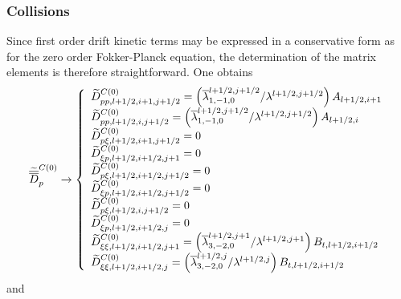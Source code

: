 

\subsubsection{Collisions}

Since first order drift kinetic terms may be expressed in a conservative
form as for the zero order Fokker-Planck equation, the determination of the
matrix elements is therefore straightforward. One obtains
\begin{equation}
\widetilde{\overline{\overline{D}}}_{p}^{C\left( 0\right) }\rightarrow
\left\{
\begin{array}{l}
\widetilde{D}_{pp,l+1/2,i+1,j+1/2}^{C\left( 0\right) }=\left( \overline{%
\lambda }_{1,-1,0}^{l+1/2,j+1/2}/\lambda ^{l+1/2,j+1/2}\right) A_{l+1/2,i+1}
\\
\widetilde{D}_{pp,l+1/2,i,j+1/2}^{C\left( 0\right) }=\left( \overline{%
\lambda }_{1,-1,0}^{l+1/2,j+1/2}/\lambda ^{l+1/2,j+1/2}\right) A_{l+1/2,i}
\\
\widetilde{D}_{p\xi ,l+1/2,i+1,j+1/2}^{C\left( 0\right) }=0 \\
\widetilde{D}_{\xi p,l+1/2,i+1/2,j+1}^{C\left( 0\right) }=0 \\
\widetilde{D}_{p\xi ,l+1/2,i+1/2,j+1/2}^{C\left( 0\right) }=0 \\
\widetilde{D}_{\xi p,l+1/2,i+1/2,j+1/2}^{C\left( 0\right) }=0 \\
\widetilde{D}_{p\xi ,l+1/2,i,j+1/2}^{C\left( 0\right) }=0 \\
\widetilde{D}_{\xi p,l+1/2,i+1/2,j}^{C\left( 0\right) }=0 \\
\widetilde{D}_{\xi \xi ,l+1/2,i+1/2,j+1}^{C\left( 0\right) }=\left(
\overline{\lambda }_{3,-2,0}^{l+1/2,j+1}/\lambda ^{l+1/2,j+1}\right)
B_{t,l+1/2,i+1/2} \\
\widetilde{D}_{\xi \xi ,l+1/2,i+1/2,j}^{C\left( 0\right) }=\left( \overline{%
\lambda }_{3,-2,0}^{l+1/2,j}/\lambda ^{l+1/2,j}\right) B_{t,l+1/2,i+1/2}
\end{array}
\right.
\end{equation}
and
